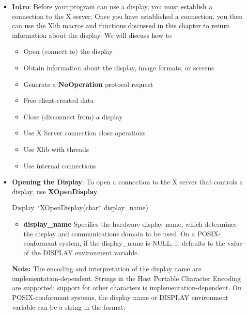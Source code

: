 \documentclass{report}
\begin{document}
    \pagebreak 
    \begin{itemize}
        \item \textbf{Intro}: Before your program can use a display, you must establish a connection to the X server. Once you have established a connection, you then can use the Xlib macros and functions discussed in this chapter to return information about the display. We will discuss how to 
            \begin{itemize}
                \item Open (connect to) the display
                \item Obtain information about the display, image formats, or screens
                \item Generate a \textbf{NoOperation} protocol request
                \item Free client-created data
                \item Close (disconnect from) a display
                \item Use X Server connection close operations
                \item Use Xlib with threads
                \item Use internal connections
            \end{itemize}
        \item \textbf{Opening the Display}: To open a connection to the X server that controls a display, use \textbf{XOpenDisplay}
            \bigbreak \noindent 
            \begin{cppcode}
            Display *XOpenDisplay(char* display_name)
            \end{cppcode}
            \bigbreak \noindent
            \begin{itemize}
                \item \textbf{display\_name} Specifies the hardware display name, which determines the display and communications domain to be used. On a POSIX-conformant system, if the display\_name is NULL, it defaults to the value of the DISPLAY environment variable.
            \end{itemize}
            \textbf{Note:} The encoding and interpretation of the display name are implementation-dependent. Strings in the Host Portable Character Encoding are supported; support for other characters is implementation-dependent. On POSIX-conformant systems, the display name or DISPLAY environment variable can be a string in the format:
            \begin{center}

\end{center}
\end{itemize}
\end{document}
